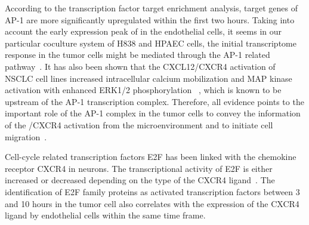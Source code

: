 \begin{itemize}
According to the transcription factor target enrichment analysis, target genes
of AP-1 are more significantly upregulated within the first two hours. 
Taking into account
the early expression peak of \tnfa in the endothelial cells, it seems
in our particular coculture system of H838 and HPAEC cells, the initial 
transcriptome response in the tumor cells might be mediated through the AP-1
related pathway~\citep{Kulbe2005}. It has also been
shown that the CXCL12/CXCR4 activation of NSCLC cell lines 
increased intracellular calcium mobilization and MAP kinase 
activation with enhanced ERK1/2 phosphorylation~%
\citep{Belperio2004}, which is 
known to be upstream of the AP-1 transcription complex.
Therefore, all evidence points to the important role of the
AP-1 complex in the tumor cells to convey the information of  
the \sdfonea/CXCR4 activation from the microenvironment and to initiate cell
migration~\citep{Busch2008,Singh2012}.

Cell-cycle related transcription factors E2F has been linked with the chemokine
receptor CXCR4 in neurons. The transcriptional activity of E2F is either 
increased or decreased depending on the type of the CXCR4 ligand~\citep{Khan2003}.
The identification of E2F family proteins as activated transcription factors 
between 3 and 10 hours in the tumor cell also correlates with the expression of 
the CXCR4 ligand \sdfonea by endothelial cells within the same time frame.



\end{itemize}
